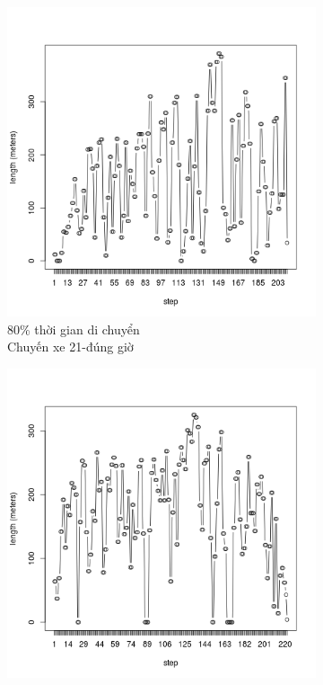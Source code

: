 \documentclass[a4paper, 13pt]{report}
\begin{document}
\begin{figure}\ContinuedFloat
        \begin{subfigure}[b]{0.25\textwidth}
                \includegraphics[width=\linewidth]{test21}
                \caption*{80\% thời gian di chuyển\\Chuyến xe 21-đúng giờ}
        \end{subfigure}%
        \begin{subfigure}[b]{0.25\textwidth}
                \includegraphics[width=\linewidth]{test22}

\end{subfigure}
\end{figure}
\end{document}
